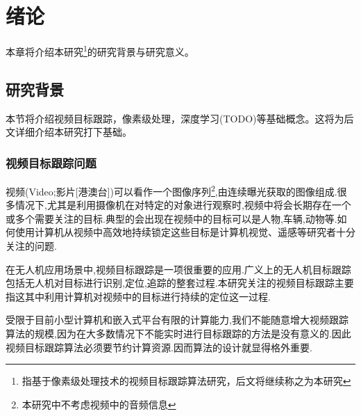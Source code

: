 
\chapter{绪论}
本章将介绍本研究\footnote{指基于像素级处理技术的视频目标跟踪算法研究，后文将继续称之为本研究}的研究背景与研究意义。

\section{研究背景}
本节将介绍视频目标跟踪，像素级处理，深度学习(TODO)等基础概念。这将为后文详细介绍本研究打下基础。

\subsection{视频目标跟踪问题}
视频(Video;影片[港澳台])可以看作一个图像序列\footnote{本研究中不考虑视频中的音频信息},由连续曝光获取的图像组成.很多情况下,尤其是利用摄像机在对特定的对象进行观察时,视频中将会长期存在一个或多个需要关注的目标.典型的会出现在视频中的目标可以是人物,车辆,动物等.如何使用计算机从视频中高效地持续锁定这些目标是计算机视觉、遥感等研究者十分关注的问题.
\par
在无人机应用场景中,视频目标跟踪是一项很重要的应用.广义上的无人机目标跟踪包括无人机对目标进行识别,定位,追踪的整套过程.本研究关注的视频目标跟踪主要指这其中利用计算机对视频中的目标进行持续的定位这一过程.
\par
受限于目前小型计算机和嵌入式平台有限的计算能力,我们不能随意增大视频跟踪算法的规模,因为在大多数情况下不能实时进行目标跟踪的方法是没有意义的.因此视频目标跟踪算法必须要节约计算资源.因而算法的设计就显得格外重要.

